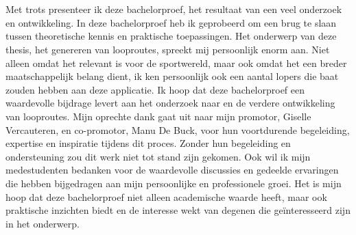 
\chapter*{}%
\label{ch:voorwoord}

Met trots presenteer ik deze bachelorproef, het resultaat van een veel onderzoek en ontwikkeling. 
In deze bachelorproef heb ik geprobeerd om een brug te slaan tussen theoretische kennis en praktische toepassingen.
Het onderwerp van deze thesis, het genereren van looproutes, spreekt mij persoonlijk enorm aan. 
Niet alleen omdat het relevant is voor de sportwereld, maar ook omdat het een breder maatschappelijk belang dient, ik ken persoonlijk ook een aantal lopers die baat zouden hebben aan deze applicatie. 
Ik hoop dat deze bachelorproef een waardevolle bijdrage levert aan het onderzoek naar en de verdere ontwikkeling van looproutes.
Mijn oprechte dank gaat uit naar mijn promotor, Giselle Vercauteren, en co-promotor, Manu De Buck, 
voor hun voortdurende begeleiding, expertise en inspiratie tijdens dit proces. 
Zonder hun begeleiding en ondersteuning zou dit werk niet tot stand zijn gekomen.
Ook wil ik mijn medestudenten bedanken voor de waardevolle discussies 
en gedeelde ervaringen die hebben bijgedragen aan mijn persoonlijke en professionele groei.
Het is mijn hoop dat deze bachelorproef niet alleen academische waarde heeft, 
maar ook praktische inzichten biedt en de interesse wekt van degenen die geïnteresseerd zijn in het onderwerp.
